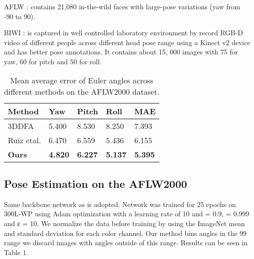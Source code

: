 \documentclass{article}
\begin{document}
\begin{CJK*}{UTF8}{gkai}
AFLW \cite{koestinger2011annotated}: contains 21,080 in-the-wild faces with large-pose variations (yaw from -90 to 90).

BIWI \cite{fanelli2011real}: is captured in well controlled laboratory environment by record RGB-D video of different people across different head pose range using a Kinect v2 device and has better pose annotations. It contains about 15, 000 images with 75 for yaw, 60 for pitch and 50 for roll. 

\begin{table}[htbp]
\centering
\begin{tabular}{lllll}
\hline \hline
Method            & Yaw    & Pitch  & Roll   & MAE    \\
\hline
3DDFA{}\cite{zhu2016face}{}     & 5.400  & 8.530  & 8.250  & 7.393  \\
\hline 
Ruiz etal.{}\cite{ruiz2017fine}{} & 6.470  & 6.559  & 5.436  & 6.155  \\
\hline 
\textbf{Ours}              & \textbf{4.820}  & \textbf{6.227}  & \textbf{5.137}  &
\textbf{5.395}\\
\hline  \hline 
\end{tabular}
\caption{Mean average error of Euler angles across different methods on the AFLW2000 dataset.}
\end{table}

\subsection{Pose Estimation on the AFLW2000}
\label{sssec:subsubhead}
Same backbone network as \cite{ruiz2017fine} is adopted. Network was trained for 25 epochs on 300L-WP using Adam optimization \cite{kinga2015method} with a learning rate of 10 and  = 0.9,  = 0.999 and ε = 10. We normalize the data before training by using the ImageNet mean and standard deviation for each color channel. Our method bins angles in the 99 range we discard images with angles outside of this range. Results can be seen in Table 1.


\end{CJK*}
\end{document}
